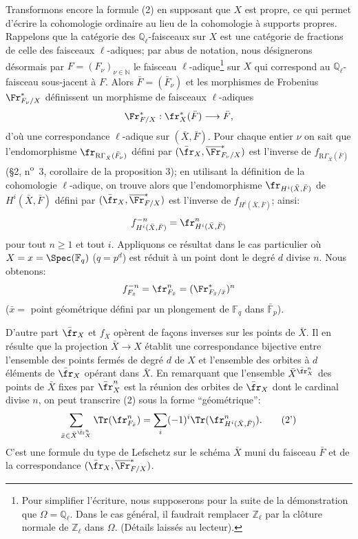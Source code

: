 Transformons encore la formule (2) en supposant que $X$ est propre, ce qui permet d'écrire la cohomologie ordinaire au lieu de la cohomologie à supports propres. Rappelons que la catégorie des $\mathbb{Q}_\ell$-faisceaux sur $X$ est une catégorie de fractions de celle des faisceaux $\ell$-adiques; par abus de notation, nous désignerons désormais par $F=(F_\nu)_{\nu\in\mathbb{N}}$ le faisceau $\ell$-adique\footnote{Pour simplifier l'écriture, nous supposerons pour la suite de la démonstration que $\Omega=\mathbb{Q}_\ell$. Dans le cas général, il faudrait remplacer $\mathbb{Z}_\ell$ par la clôture normale de $\mathbb{Z}_\ell$ dans $\Omega$. (Détails laissés au lecteur).} sur $X$ qui correspond au $\mathbb{Q}_\ell$-faisceau sous-jacent à $F$. Alors $\bar F=(\bar F_\nu)$ et les morphismes de Frobenius $\Fr^*_{F_\nu/X}$ définissent un morphisme de faisceaux $\ell$-adiques
\[
\Fr^*_{F/X}:\fr_X^*(\bar F)\longrightarrow\bar F,
\]
d'où une correspondance $\ell$-adique sur $(\bar X,\bar F)$. Pour chaque entier $\nu$ on sait que l'endomorphisme $\fr_{\mathrm{R}\Gamma_{\bar X}(\bar F_\nu)}$ défini par $(\bar{\fr}_X,\overline{\Fr}^*_{F_\nu/X})$ est l'inverse de $f_{\mathrm{R}\Gamma_{\bar X}(\bar F)}$ (§2, n\textsuperscript{o}~3, corollaire de la proposition 3); en utilisant la définition de la cohomologie $\ell$-adique, on trouve alors que l'endomorphisme $\fr_{H^i(\bar X,\bar F)}$ de $H^i(\bar X,\bar F)$ défini par $(\bar{\fr}_X,\overline{\Fr}^*_{F/X})$ est l'inverse de $f_{H^i(\bar X,\bar F)}$; ainsi:
\[
f^{-n}_{H^i(\bar X,\bar F)}=\fr^n_{H^i(\bar X,\bar F)}
\]
pour tout $n\ge1$ et tout $i$.
Appliquons ce résultat dans le cas particulier où $X=x=\Spec(\mathbb{F}_q)$ ($q=p^d$) est réduit à un point dont le degré $d$ divise $n$. Nous obtenons:
\[
f^{-n}_{F_{\bar x}}=\fr^n_{F_{\bar x}}=(\Fr^*_{F_{\bar x}/\bar x})^n
\]
($\bar x=$ point
géométrique défini par un plongement de $\mathbb{F}_q$ dans $\bar{\mathbb{F}}_p$).

D'autre part $\bar{\fr}_X$ et $f_X$ opèrent de façons inverses sur les points de $\bar X$. Il en résulte que la projection $\bar X\to X$ établit une correspondance bijective entre l'ensemble des points fermés de degré $d$ de $X$ et l'ensemble des orbites à $d$ éléments de $\bar{\fr}_X$ opérant dans $\bar X$. En remarquant que l'ensemble $\bar X^{\bar{\fr}_X^n}$ des points de $\bar X$ fixes par $\bar{\fr}_X^n$ est la réunion des orbites de $\bar{\fr}_X$ dont le cardinal divise $n$, on peut transcrire (2) sous la forme ``géométrique'':
\[
\sum_{\bar x\in\bar X^{\bar{\fr}_X^n}}\Tr(\fr^n_{F_{\bar x}})
=\sum_i(-1)^i\Tr(\fr^n_{H^i(\bar X,\bar F)}).
\tag{2'}
\]
C'est une formule du type de Lefschetz sur le schéma $\bar X$ muni du faisceau $\bar F$ et de la correspondance $(\bar{\fr}_X,\overline{\Fr}^*_{F/X})$.

